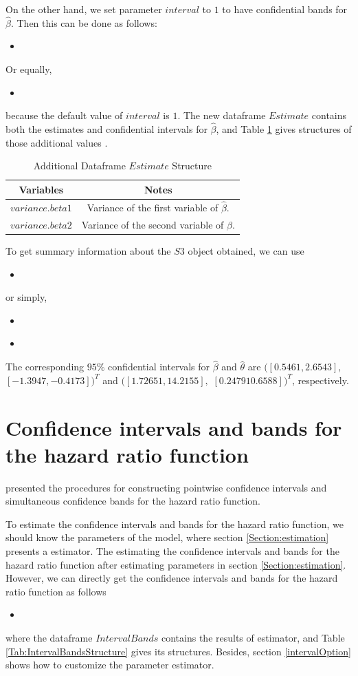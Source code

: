 \documentclass[12pt]{article}
\newcommand{\insertcode}[2]{\begin{itemize}\item[]\end{itemize}} %
\begin{document}
On the other hand, we set parameter $interval$ to $1$  to have confidential bands for $\hat{\beta}$.
Then this can be done as follows:
\insertcode{"Scripts/code8.pl"}{Performing estimator with confidential bands.}
Or equally,
\insertcode{"Scripts/code9.pl"}{Performing estimator with confidential bands.}
because the default value of $interval$ is $1$.
The new dataframe $Estimate$ contains both the estimates and confidential intervals for $\hat{\beta}$, and Table \ref{Tab:AdditionalEstimateStructure} gives structures of those additional values .
\begin{table}[!h]
\renewcommand{\arraystretch}{1.3}
\caption{Additional Dataframe $Estimate$ Structure} \label{Tab:AdditionalEstimateStructure} \centering
\begin{tabular}{|c||c|}
  \hline
  Variables & Notes  \\
  \hline
  $variance.beta1$ & Variance of the first variable of $\hat{\beta}$. \\
  $variance.beta2$ & Variance of the second variable of $\hat{\beta}$. \\
  \hline
\end{tabular}
\end{table}

To get summary information about the $S3$ object obtained, we can use
\insertcode{"Scripts/code11.pl"}{}
or simply,
\insertcode{"Scripts/code11s.pl"}{Summarizing estimates' results with confidential bands.}
\insertcode{"Scripts/result11.pl"}{Results of scripts.}

The corresponding $95\%$ confidential intervals for $\hat{\beta}$ and $\hat{\theta}$ are  $([0.5461,2.6543],$ $[-1.3947,-0.4173])^T$ and $([1.72651,14.2155],$ $[0.24791  0.6588])^T$, respectively.


\section{Confidence intervals and bands for the hazard ratio function}\label{Section.Intervals}
 \cite{yang2011estimation} presented the procedures for constructing pointwise confidence intervals and simultaneous confidence bands for the hazard ratio function.

 To estimate the confidence intervals and bands for the hazard ratio function, we should know the parameters of the model,  where section \ref{Section:estimation} presents a estimator.
The estimating the confidence intervals and bands for the hazard ratio function after estimating parameters in section \ref{Section:estimation}. However, we can directly get the confidence intervals and bands for the hazard ratio function as follows
\insertcode{"Scripts/code14.pl"}{Performing confidence intervals and bands estimation.}
where the dataframe $IntervalBands$ contains the results of estimator, and Table \ref{Tab:IntervalBandsStructure} gives its structures. Besides, section \ref{intervalOption} shows how to customize the parameter estimator.
\end{document}
